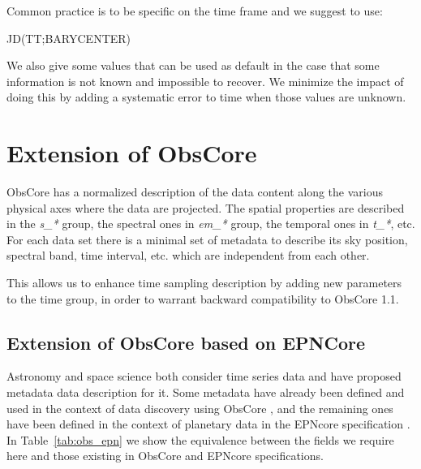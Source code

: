 \documentclass[11pt,a4paper]{ivoa}
\begin{document}
Common practice is to be specific on the time frame and we suggest to use:
\begin{center}
  JD(TT;BARYCENTER)
\end{center}
We also give some values that can be used as default in the case that some information is not known and impossible to recover. We minimize the impact of doing this by adding a systematic error to time when those values are unknown.

\section{Extension of ObsCore}
ObsCore has a normalized description of the data content along the various physical axes where the data are projected.
The spatial properties are described in the \emph{s\_*} group, the spectral ones in \emph{em\_*} group, the temporal ones in \emph{t\_*}, etc.
For each data set there is a minimal  set of metadata to describe its sky position, spectral band, time interval, etc. which are independent from each other.

This allows us to enhance time sampling description by adding new parameters to the time group, in order to warrant backward compatibility to ObsCore 1.1.

\subsection{Extension of ObsCore based on EPNCore}
Astronomy and space science both consider time series data and have proposed metadata data description for it. Some metadata have already been defined and used in the context of data discovery using ObsCore \citep{2017ivoa.spec.0509L}, and the remaining ones have been defined in the context of planetary data in the EPNcore specification \citep{2022ivoa.spec.0822E}. In Table~\ref{tab:obs_epn} we show the equivalence between the fields we require here and those existing in  ObsCore and EPNcore specifications.
\end{document}

